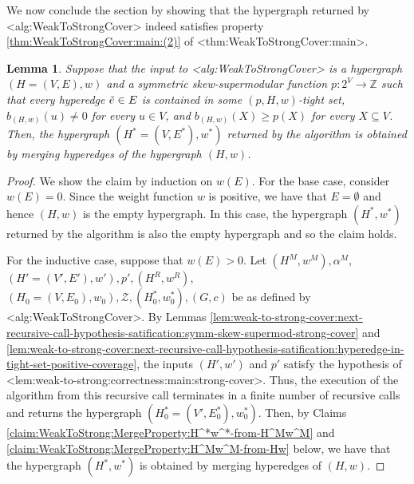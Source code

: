 \documentclass{article}
\def\Cref#1{<#1>}%
\newtheorem{lemma}{Lemma}[section]
\newcommand{\zeros}{\ensuremath{\mathcal{Z}}\xspace}
\providecommand{\Z}{\mathbb{Z}}
\begin{document}
We now conclude the section by showing that the hypergraph returned by \Cref{alg:WeakToStrongCover} indeed satisfies property \ref{thm:WeakToStrongCover:main:(2)} of \Cref{thm:WeakToStrongCover:main}.

\begin{lemma}\label{lem:weak-to-strong:correctness:main:hyperedge-merge}
    Suppose that the input to \Cref{alg:WeakToStrongCover} is a hypergraph $(H = (V, E), w)$ and a symmetric skew-supermodular function $p:2^V\rightarrow \Z$ %
such that every hyperedge $\Tilde{e} \in E$ is contained in some $(p, H, w)$-tight set, $b_{(H,w)}(u) \not = 0$ for every $u \in V$, and $b_{(H,w)}(X) \geq p(X)$ for every $X \subseteq V$. 
    Then, the hypergraph $(H^* = (V, E^*), w^*)$ returned by the algorithm is obtained by merging hyperedges of the hypergraph $(H, w)$.
\end{lemma}
\begin{proof}
     We show the claim by induction on $w(E)$. For the base case, consider $w(E) = 0$. Since the weight function $w$ is positive, we have that $E = \emptyset$ and hence $(H, w)$ is the empty hypergraph. In this case, the hypergraph $(H^*, w^*)$ returned by the algorithm is also the empty hypergraph and so the claim holds. 

    For the inductive case, suppose that $w(E) > 0$. Let $(H^M, w^M), \alpha^M$, $(H' = (V', E'), w'), p',(H^R, w^R)$, $(H_0 = (V, E_0), w_0), \zeros, (H^*_0, w^*_0), (G, c)$ be as defined by \Cref{alg:WeakToStrongCover}. By Lemmas \ref{lem:weak-to-strong-cover:next-recursive-call-hypothesis-satification:symm-skew-supermod-strong-cover} and \ref{lem:weak-to-strong-cover:next-recursive-call-hypothesis-satification:hyperedge-in-tight-set-positive-coverage}, the inputs $(H',w')$ and $p'$ satisfy the hypothesis of \Cref{lem:weak-to-strong:correctness:main:strong-cover}. 
    Thus, the execution of the algorithm from this recursive call terminates in a finite number of recursive calls and returns the hypergraph $(H_0^* = (V', E_0^*), w_0^*)$. 
    Then, by Claims \ref{claim:WeakToStrong:MergeProperty:H^*w^*-from-H^Mw^M} and \ref{claim:WeakToStrong:MergeProperty:H^Mw^M-from-Hw} below, we have that the hypergraph $(H^*, w^*)$ is obtained by merging hyperedges of $(H, w)$.
    \end{proof}
\end{document}
